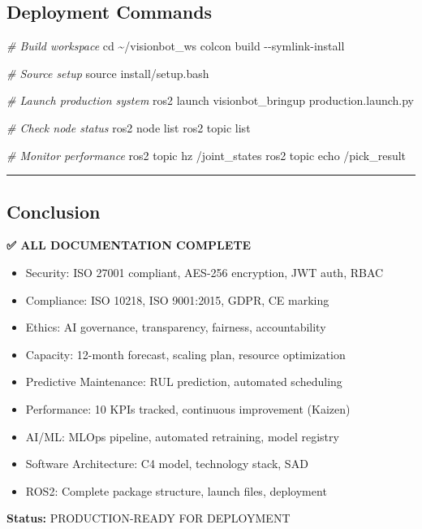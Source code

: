 \documentclass[
]{article}
\newenvironment{Shaded}{\begin{snugshade}}{\end{snugshade}}
\newcommand{\AttributeTok}[1]{\textcolor[rgb]{0.13,0.29,0.53}{#1}}
\newcommand{\BuiltInTok}[1]{#1}
\newcommand{\CommentTok}[1]{\textcolor[rgb]{0.56,0.35,0.01}{\textit{#1}}}
\newcommand{\ExtensionTok}[1]{#1}
\newcommand{\NormalTok}[1]{#1}
\providecommand{\tightlist}{%
  \setlength{\itemsep}{0pt}\setlength{\parskip}{0pt}}
\begin{document}
\hypertarget{deployment-commands}{%
\subsection{Deployment Commands}\label{deployment-commands}}

\begin{Shaded}
\begin{Highlighting}[]
\CommentTok{\# Build workspace}
\BuiltInTok{cd}\NormalTok{ \textasciitilde{}/visionbot\_ws}
\ExtensionTok{colcon}\NormalTok{ build }\AttributeTok{{-}{-}symlink{-}install}

\CommentTok{\# Source setup}
\BuiltInTok{source}\NormalTok{ install/setup.bash}

\CommentTok{\# Launch production system}
\ExtensionTok{ros2}\NormalTok{ launch visionbot\_bringup production.launch.py}

\CommentTok{\# Check node status}
\ExtensionTok{ros2}\NormalTok{ node list}
\ExtensionTok{ros2}\NormalTok{ topic list}

\CommentTok{\# Monitor performance}
\ExtensionTok{ros2}\NormalTok{ topic hz /joint\_states}
\ExtensionTok{ros2}\NormalTok{ topic echo /pick\_result}
\end{Highlighting}
\end{Shaded}

\begin{center}\rule{0.5\linewidth}{0.5pt}\end{center}

\hypertarget{conclusion}{%
\subsection{Conclusion}\label{conclusion}}

\textbf{✅ ALL DOCUMENTATION COMPLETE}

\begin{itemize}
\tightlist
\item
  Security: ISO 27001 compliant, AES-256 encryption, JWT auth, RBAC
\item
  Compliance: ISO 10218, ISO 9001:2015, GDPR, CE marking
\item
  Ethics: AI governance, transparency, fairness, accountability
\item
  Capacity: 12-month forecast, scaling plan, resource optimization
\item
  Predictive Maintenance: RUL prediction, automated scheduling
\item
  Performance: 10 KPIs tracked, continuous improvement (Kaizen)
\item
  AI/ML: MLOps pipeline, automated retraining, model registry
\item
  Software Architecture: C4 model, technology stack, SAD
\item
  ROS2: Complete package structure, launch files, deployment
\end{itemize}

\textbf{Status:} PRODUCTION-READY FOR DEPLOYMENT 🚀
\end{document}
